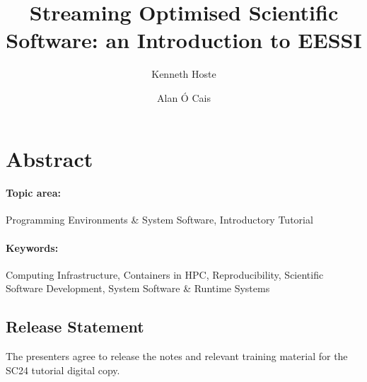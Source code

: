\documentclass[a4paper,11pt]{article}
\begin{document}

\title{
    \textbf{\LARGE Streaming Optimised Scientific Software: an Introduction to EESSI}\\
}

\date{}

\author[1]{Kenneth Hoste}
\author[2]{Alan \'O Cais}


\renewcommand\Authands{ and }

\maketitle


\section*{Abstract}


\paragraph{Topic area:} Programming Environments \& System Software, Introductory Tutorial

\paragraph{Keywords:} Computing Infrastructure, Containers in HPC, Reproducibility, Scientific Software Development, System Software \& Runtime Systems


\newpage




\newpage

\subsection*{Release Statement}

The presenters agree to release the notes and relevant training material for the SC24 tutorial digital copy.


\end{document}
